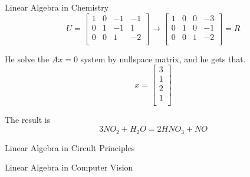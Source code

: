 \documentclass{beamer}
\begin{document}
\begin{frame}{Linear Algebra in Chemistry}
\begin{equation*}
    U=\left[ \begin{matrix}
        1&		0&		-1&		-1\\
        0&		1&		-1&		1\\
        0&		0&		1&		-2\\
    \end{matrix} \right] \rightarrow \left[ \begin{matrix}
        1&		0&		0&		-3\\
        0&		1&		0&		-1\\
        0&		0&		1&		-2\\
    \end{matrix} \right] =R
\end{equation*}

He solve the $Ax=0$ system by nullspace matrix, and he gets that.
\begin{equation*}
    x=\left[ \begin{array}{c}
        3\\
        1\\
        2\\
        1\\
    \end{array} \right]
\end{equation*}

The result is
\begin{equation*}
    3NO_2+H_2O= 2HNO_3+NO
\end{equation*}
\end{frame}


\begin{frame}{Linear Algebra in Circult Principles}

\end{frame}

\begin{frame}{Linear Algebra in Computer Vision}

\end{frame}
\end{document}
